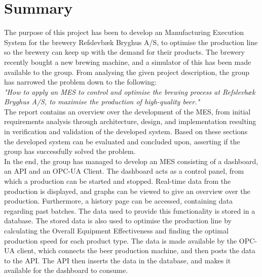 \section{Summary}
The purpose of this project has been to develop an Manufacturing Execution
System for the brewery Refslevbæk Bryghus A/S, to optimise the production line
so the brewery can keep up with the demand for their products. The brewery
recently bought a new brewing machine, and a simulator of this has been made
available to the group. From analysing the given project description, the group
has narrowed the problem down to the following:\\

\textit{"How to apply an MES to control and optimise the brewing process at
Refslevbæk Bryghus A/S, to maximise the production of high-quality beer."}\\

The report contains an overview over the development of the MES, from initial
requirements analysis through architecture, design, and implementation resulting
in verification and validation of the developed system. Based on these sections
the developed system can be evaluated and concluded upon, asserting if the
group has successfully solved the problem.\\

In the end, the group has managed to develop an MES consisting of a dashboard,
an API and an OPC-UA Client. The dashboard acts as a control panel, from which a
production can be started and stopped. Real-time data from the production is
displayed, and graphs can be viewed to give an overview over the production.
Furthermore, a history page can be accessed, containing data regarding past
batches. The data used to provide this functionality is stored in a database.
The stored data is also used to optimise the production line by calculating the
Overall Equipment Effectiveness and finding the optimal production speed for
each product type. The data is made available by the OPC-UA client, which
connects the beer production machine, and then posts the data to the API. The
API then inserts the data in the database, and makes it available for the
dashboard to consume.